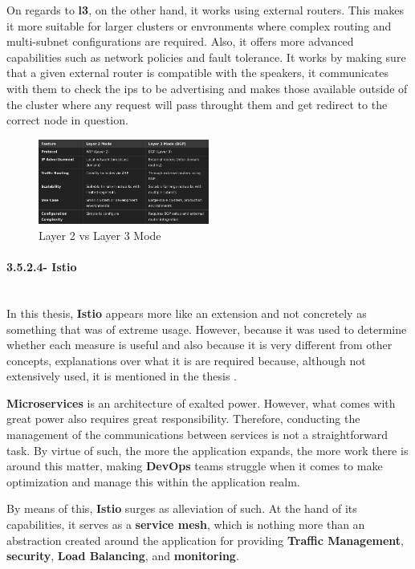On regards to \textbf{l3}, on the other hand, it works using external routers. This makes it more suitable for larger clusters or envronments where complex routing and multi-subnet configurations are required. Also, it offers more advanced capabilities such as network policies and fault tolerance. It works by making sure that a given external router is compatible with the speakers, it communicates with them to check the ips to be advertising and makes those available outside of the cluster where any request will pass throught them and get redirect to the correct node in question.

\begin{figure}[H]
    \centering
    \includegraphics[width=0.5\textwidth]{assets/tools/metallb/bgp-vs-l2.png} %
    \caption{Layer 2 vs Layer 3 Mode}
    \label{fig:sample-image} 
\end{figure}

\paragraph{3.5.2.4- Istio}\mbox{}\\
In this thesis, \textbf{Istio} appears more like an extension and not concretely as something that was of extreme usage. However, because it was used to determine whether each measure is useful and also because it is very different from other concepts, explanations over what it is are required because, although not extensively used, it is mentioned in the thesis \cite{istio}.

\textbf{Microservices} is an architecture of exalted power. However, what comes with great power also requires great responsibility. Therefore, conducting the management of the communications between services is not a straightforward task. By virtue of such, the more the application expands, the more work there is around this matter, making \textbf{DevOps} teams struggle when it comes to make optimization and manage this within the application realm.

By means of this, \textbf{Istio} surges as alleviation of such. At the hand of its capabilities, it serves as a \textbf{service mesh}, which is nothing more than an abstraction created around the application for providing \textbf{Traffic Management}, \textbf{security}, \textbf{Load Balancing}, and \textbf{monitoring}.

